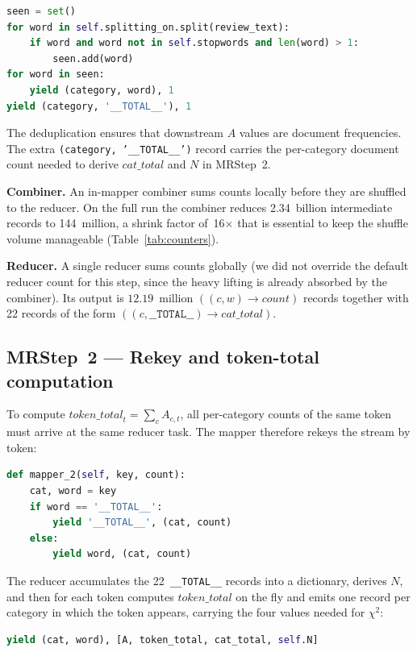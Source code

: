 \documentclass[11pt,a4paper]{article}
\begin{document}
\begin{lstlisting}[language=Python]
seen = set()
for word in self.splitting_on.split(review_text):
    if word and word not in self.stopwords and len(word) > 1:
        seen.add(word)
for word in seen:
    yield (category, word), 1
yield (category, '__TOTAL__'), 1
\end{lstlisting}

The deduplication ensures that downstream $A$ values are document
frequencies. The extra \texttt{(category, '\_\_TOTAL\_\_')} record carries
the per-category document count needed to derive $\textit{cat\_total}$ and
$N$ in MRStep~2.

\textbf{Combiner.}  An in-mapper combiner sums counts locally before they
are shuffled to the reducer. On the full run the combiner reduces
2.34~billion intermediate records to 144~million, a shrink factor of~16$\times$
that is essential to keep the shuffle volume manageable
(Table~\ref{tab:counters}).

\textbf{Reducer.}  A single reducer sums counts globally (we did not
override the default reducer count for this step, since the heavy lifting
is already absorbed by the combiner). Its output is $12.19$~million
$((c,w)\!\to\!\textit{count})$ records together with 22 records of the form
$((c,\texttt{\_\_TOTAL\_\_})\!\to\!\textit{cat\_total})$.

\subsection{MRStep~2 --- Rekey and token-total computation}

To compute $\textit{token\_total}_t = \sum_{c} A_{c,t}$, all per-category
counts of the same token must arrive at the same reducer task. The mapper
therefore rekeys the stream by token:

\begin{lstlisting}[language=Python]
def mapper_2(self, key, count):
    cat, word = key
    if word == '__TOTAL__':
        yield '__TOTAL__', (cat, count)
    else:
        yield word, (cat, count)
\end{lstlisting}

The reducer accumulates the 22~\texttt{\_\_TOTAL\_\_} records into a
dictionary, derives $N$, and then for each token computes
$\textit{token\_total}$ on the fly and emits one record per category in
which the token appears, carrying the four values needed for $\chi^{2}$:

\begin{lstlisting}[language=Python]
yield (cat, word), [A, token_total, cat_total, self.N]
\end{lstlisting}
\end{document}
